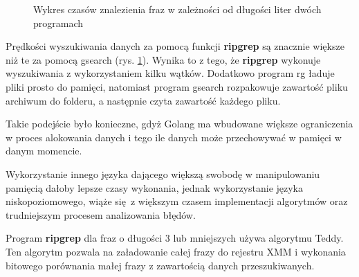 \begin{figure}[htbp]
    \centering
    \caption{Wykres czasów znalezienia fraz w zależności od długości liter dwóch programach}
    \label{fig:wykresPorównaniaCzasówWyszukań}
\end{figure}

Prędkości wyszukiwania danych za pomocą funkcji \textbf{ripgrep} są znacznie większe niż te
za pomocą gsearch (rys. \ref{fig:wykresPorównaniaCzasówWyszukań}). Wynika to z
tego, że \textbf{ripgrep} wykonuje wyszukiwania z wykorzystaniem kilku wątków. Dodatkowo 
program rg ładuje pliki prosto do pamięci, natomiast program gsearch rozpakowuje
zawartość pliku archiwum do folderu, a następnie czyta zawartość każdego pliku.

Takie podejście było konieczne, gdyż Golang ma wbudowane większe ograniczenia w 
proces alokowania danych i tego ile danych może przechowywać w pamięci w danym momencie.

Wykorzystanie innego języka dającego większą swobodę w manipulowaniu pamięcią 
dałoby lepsze czasy wykonania, jednak wykorzystanie języka niskopoziomowego,
wiąże się z większym czasem implementacji algorytmów oraz trudniejszym procesem
analizowania błędów.

Program \textbf{ripgrep} dla fraz o długości 3 lub mniejszych używa algorytmu Teddy. Ten algorytm
pozwala na załadowanie całej frazy do rejestru XMM i wykonania bitowego 
porównania małej frazy z zawartością danych przeszukiwanych.

